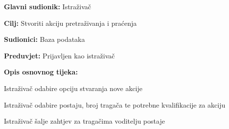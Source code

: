 					\noindent {}
					\begin{packed_item}
						
						\item \textbf{Glavni sudionik: }Istraživač
						\item  \textbf{Cilj:} Stvoriti akciju pretraživanja i praćenja
						\item  \textbf{Sudionici:} Baza podataka
						\item  \textbf{Preduvjet:} Prijavljen kao istraživač
						\item  \textbf{Opis osnovnog tijeka:}
						
						\item[] \begin{packed_enum}
							
							\item Istraživač odabire opciju stvaranja nove akcije
							\item Istraživač odabire postaju, broj tragača te potrebne kvalifikacije za akciju 
							\item Istraživač šalje zahtjev za tragačima voditelju postaje
							
							
						\end{packed_enum}
							
						
					\end{packed_item}
					
